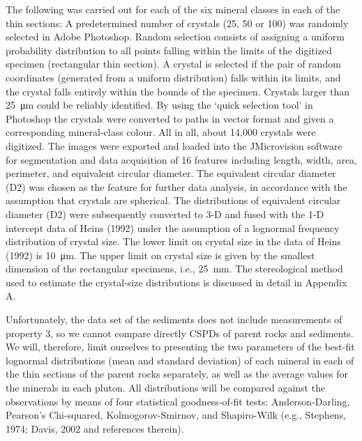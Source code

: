     The following was carried out for each of the six mineral classes in each of the thin sections: A predetermined number of crystals (25, 50 or 100) was randomly selected in Adobe Photoshop. %
    Random selection consists of assigning a uniform probability distribution to all points falling within the limits of the digitized specimen (rectangular thin section). %
    A crystal is selected if the pair of random coordinates (generated from a uniform distribution) falls within its limits, and the crystal falls entirely within the bounds of the specimen. %
    Crystals larger than \SI{25}{\micro\metre} could be reliably identified. %
    By using the ‘quick selection tool’ in Photoshop the crystals were converted to paths in vector format and given a corresponding mineral-class colour. %
    All in all, about 14,000 crystals were digitized. %
    The images were exported and loaded into the JMicrovision software for segmentation and data acquisition of 16 features including length, width, area, perimeter, and equivalent circular diameter. %
    The equivalent circular diameter (D2) was chosen as the feature for further data analysis, in accordance with the assumption that crystals are spherical. %
    The distributions of equivalent circular diameter (D2) were subsequently converted to 3-D and fused with the 1-D intercept data of Heins (1992) under the assumption of a lognormal frequency distribution of crystal size. %
    The lower limit on crystal size in the data of Heins (1992) is \SI{10}{\micro\metre}. %
    The upper limit on crystal size is given by the smallest dimension of the rectangular specimens, i.e., \ca \SI{25}{\milli\metre}. %
    The stereological method used to estimate the crystal-size distributions is discussed in detail in Appendix A.

    Unfortunately, the data set of the sediments does not include measurements of property 3, so we cannot compare directly CSPDs of parent rocks and sediments. %
    We will, therefore, limit ourselves to presenting the two parameters of the best-fit lognormal distributions (mean and standard deviation) of each mineral in each of the thin sections of the parent rocks separately, as well as the average values for the minerals in each pluton. %
    All distributions will be compared against the observations by means of four statistical goodness-of-fit tests: Anderson-Darling, Pearson's Chi-squared, Kolmogorov-Smirnov, and Shapiro-Wilk (e.g., Stephens, 1974; Davis, 2002 and references therein).



\cleardoublepage

